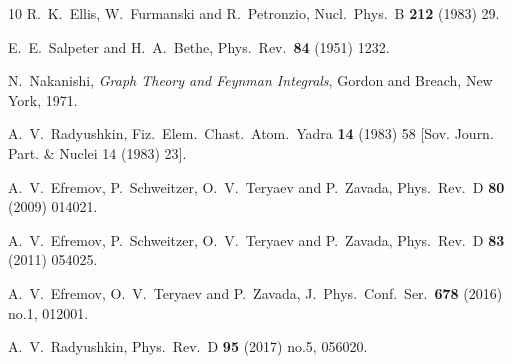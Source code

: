 \documentclass[final,5p,times,twocolumn]{elsarticle}
\begin{document}
\begin{thebibliography}{10}
  R.~K.~Ellis, W.~Furmanski and R.~Petronzio,
  Nucl.\ Phys.\ B {\bf 212} (1983) 29.



  E.~E.~Salpeter and H.~A.~Bethe,
  Phys.\ Rev.\  {\bf 84} (1951) 1232.



N.~Nakanishi, {\it Graph Theory and Feynman Integrals}, Gordon and Breach, New
  York, 1971.

  A.~V.~Radyushkin,
  Fiz.\ Elem.\ Chast.\ Atom.\ Yadra {\bf 14} (1983) 58
 [Sov. Journ. Part. \& Nuclei 14  (1983) 23].


  A.~V.~Efremov, P.~Schweitzer, O.~V.~Teryaev and P.~Zavada,
  Phys.\ Rev.\ D {\bf 80} (2009) 014021.
  
  A.~V.~Efremov, P.~Schweitzer, O.~V.~Teryaev and P.~Zavada,
  Phys.\ Rev.\ D {\bf 83} (2011) 054025.

  A.~V.~Efremov, O.~V.~Teryaev and P.~Zavada,
  J.\ Phys.\ Conf.\ Ser.\  {\bf 678} (2016) no.1,  012001.
  


  A.~V.~Radyushkin,
  Phys.\ Rev.\ D {\bf 95} (2017) no.5,  056020. 


\end{thebibliography}



    
\end{document}
